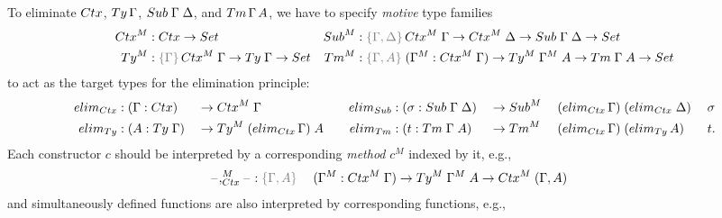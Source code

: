 \documentclass[a4paper,UKenglish,numberwithinsect,cleveref,thm-restate]{lipics-v2021}
\begin{document}
To eliminate $\Ctx$, $\Ty\,\Gamma$, $\Sub\;\Gamma\;\Delta$, and $\Tm\,\Gamma\,A$, we have to specify \emph{motive} type families
\begin{align*}
  \Ctx^M & : \Ctx \to \Set &
  \Sub^M & : \implicit{\Gamma, \Delta}\,\Ctx^M\;\Gamma \to \Ctx^M\;\Delta \to \Sub\;\Gamma\;\Delta \to \Set \\
  \Ty^M  & : \implicit{\Gamma}\,\Ctx^M\;\Gamma \to \Ty\;\Gamma \to \Set & 
  \Tm^M  & : \implicit{\Gamma, A}\; (\Gamma^M : \Ctx^M\;\Gamma) \to \Ty^M\;\Gamma^M\;A \to \Tm\;\Gamma\;A \to \Set
\end{align*}
to act as the target types for the elimination principle:
\begin{alignat*}{10}
  \elim_{\Ctx} & : (\Gamma : \Ctx)   && \to \Ctx^M\;\Gamma &
  \elim_{\Sub} & : (\sigma : \Sub\;\Gamma\;\Delta) && \to \Sub^M\; && (\elim_{\Ctx}\,\Gamma)\;(\elim_{\Ctx}\;\Delta)\;&&\sigma \\
  \elim_{\Ty}  & : (A : \Ty\;\Gamma) && \to \Ty^M\;(\elim_{\Ctx}\,\Gamma)\;A \quad
               & \elim_{\Tm}  & : (t : \Tm\;\Gamma\;A) && \to \Tm^M\; && (\elim_{\Ctx}\,\Gamma)\;(\elim_{\Ty}\,A)\;&&t.
\end{alignat*}
Each constructor $c$ should be interpreted by a corresponding \emph{method} $c^M$ indexed by it, e.g.,
\begin{alignat*}{3}
  \blank,_{\Ctx}^M\blank & : \implicit{\Gamma, A}\; && (\Gamma^M : \Ctx^M\;\Gamma) \to \Ty^M\;\Gamma^M\;A \to \Ctx^M\;(\Gamma, A) %
\end{alignat*}
and simultaneously defined functions are also interpreted by corresponding functions, e.g.,
\end{document}
